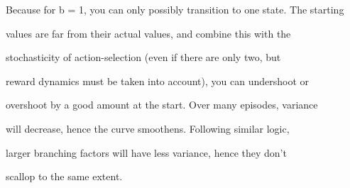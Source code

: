 \documentclass{article}
\begin{document}
Because for b = 1, you can only possibly transition to one state. The starting 

values are far from their actual values, and combine this with the 

stochasticity of action-selection (even if there are only two, but

reward dynamics must be taken into account), you can undershoot or 

overshoot by a good amount at the start. Over many episodes, variance 

will decrease, hence the curve smoothens. Following similar logic, 

larger branching factors will have less variance, hence they don't 

scallop to the same extent.
\end{document}
